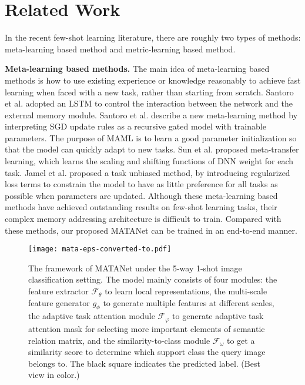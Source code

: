 \documentclass[final]{cvpr}
\begin{document}
	\section{Related Work}
	In the recent few-shot learning literature, there are roughly two types of methods: meta-learning based method and metric-learning based method.
	
	\textbf{Meta-learning based methods.} 
	The main idea of meta-learning based methods \cite{ravi2016optimization,finn2017model,sun2019meta,jamal2019task} is how to use existing experience or knowledge reasonably to achieve fast learning when faced with a new task, rather than starting from scratch.
	Santoro et al. \cite{santoro2016meta} adopted an LSTM to control the interaction between the network and the external memory module. 
	Santoro et al. \cite{ravi2016optimization} describe a new meta-learning method by interpreting SGD update rules as a recursive gated model with trainable parameters.
	The purpose of MAML \cite{finn2017model} is to learn a good parameter initialization so that the model can quickly adapt to new tasks.
	Sun et al. \cite{sun2019meta} proposed meta-transfer learning, which learns the scaling and shifting functions of DNN weight for each task.
	Jamel et al. \cite{jamal2019task} proposed a task unbiased method, by introducing regularized loss terms to constrain the model to have as little preference for all tasks as possible when parameters are updated.
	Although these meta-learning based methods have achieved outstanding results on few-shot learning tasks, their complex memory addressing architecture is difficult to train. Compared with these methods, our proposed MATANet can be trained in an end-to-end manner. 
	\begin{figure*}[t]
		\centering
		\texttt{[image: mata-eps-converted-to.pdf]}
		\caption{The framework of MATANet under the 5-way 1-shot image classification setting. The model mainly consists of four modules: the feature extractor $\mathcal{F}_{\theta}$ to learn local representations, the multi-scale feature generator $g_{\phi}$ to generate multiple features at different scales, the adaptive task attention module $\mathcal{F}_{\varphi}$ to generate adaptive task attention mask for selecting more important elements of semantic relation matrix, and the similarity-to-class module $\mathcal{F}_{\omega }$ to get a similarity score to determine which support class the query image belongs to. The black square indicates the predicted label. (Best view in color.)}
		\label{atanet_architecture}
	\end{figure*}
	
\end{document}
